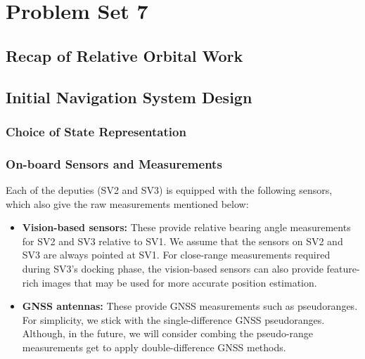 \section{Problem Set 7}

\subsection{Recap of Relative Orbital Work}

\subsection{Initial Navigation System Design}

\subsubsection{Choice of State Representation}

\subsubsection{On-board Sensors and Measurements}

Each of the deputies (SV2 and SV3) is equipped with the following sensors, which also give the raw measurements mentioned below:
\begin{itemize}
    \item \textbf{Vision-based sensors:} These provide relative bearing angle measurements for SV2 and SV3 relative to SV1. We assume that the sensors on SV2 and SV3 are always pointed at SV1. For close-range measurements required during SV3's docking phase, the vision-based sensors can also provide feature-rich images that may be used for more accurate position estimation. 
    \item \textbf{GNSS antennas:} These provide GNSS measurements such as pseudoranges. For simplicity, we stick with the single-difference GNSS pseudoranges. Although, in the future, we will consider combing the pseudo-range measurements get to apply double-difference GNSS methods.
\end{itemize}

